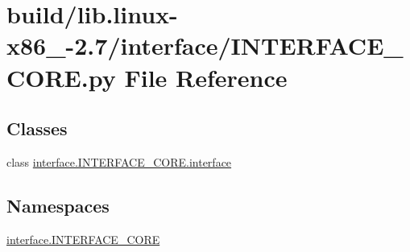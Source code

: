 \hypertarget{build_2lib_8linux-x86__64-2_87_2interface_2INTERFACE__CORE_8py}{}\section{build/lib.linux-\/x86\+\_-\/2.7/interface/\+I\+N\+T\+E\+R\+F\+A\+C\+E\+\_\+\+C\+O\+R\+E.py File Reference}
\label{build_2lib_8linux-x86__64-2_87_2interface_2INTERFACE__CORE_8py}
\subsection*{Classes}
\begin{DoxyCompactItemize}
\item 
class \hyperlink{classinterface_1_1INTERFACE__CORE_1_1interface}{interface.\+I\+N\+T\+E\+R\+F\+A\+C\+E\+\_\+\+C\+O\+R\+E.\+interface}
\end{DoxyCompactItemize}
\subsection*{Namespaces}
\begin{DoxyCompactItemize}
\item 
 \hyperlink{namespaceinterface_1_1INTERFACE__CORE}{interface.\+I\+N\+T\+E\+R\+F\+A\+C\+E\+\_\+\+C\+O\+R\+E}
\end{DoxyCompactItemize}
